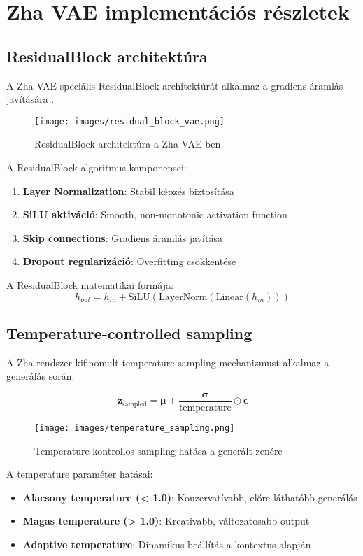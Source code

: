 \section{Zha VAE implementációs részletek}

\subsection{ResidualBlock architektúra}
A Zha VAE speciális ResidualBlock architektúrát alkalmaz a gradiens áramlás javítására \cite{brunner2018midivae}.

\begin{figure}[h]
\centering
\texttt{[image: images/residual\_block\_vae.png]}
\caption{ResidualBlock architektúra a Zha VAE-ben}
\label{fig:residual_block}
\end{figure}

A ResidualBlock algoritmus komponensei:
\begin{enumerate}
\item \textbf{Layer Normalization}: Stabil képzés biztosítása
\item \textbf{SiLU aktiváció}: Smooth, non-monotonic activation function
\item \textbf{Skip connections}: Gradiens áramlás javítása
\item \textbf{Dropout regularizáció}: Overfitting csökkentése
\end{enumerate}

A ResidualBlock matematikai formája:
\[
h_{out} = h_{in} + \text{SiLU}(\text{LayerNorm}(\text{Linear}(h_{in})))
\]

\subsection{Temperature-controlled sampling}
A Zha rendszer kifinomult temperature sampling mechanizmust alkalmaz a generálás során:

\[
\mathbf{z}_{\text{sampled}} = \boldsymbol{\mu} + \frac{\boldsymbol{\sigma}}{\text{temperature}} \odot \boldsymbol{\epsilon}
\]

\begin{figure}[h]
\centering
\texttt{[image: images/temperature\_sampling.png]}
\caption{Temperature kontrollos sampling hatása a generált zenére}
\label{fig:temperature}
\end{figure}

A temperature paraméter hatásai:
\begin{itemize}
\item \textbf{Alacsony temperature (< 1.0)}: Konzervatívabb, előre láthatóbb generálás
\item \textbf{Magas temperature (> 1.0)}: Kreatívabb, változatosabb output
\item \textbf{Adaptive temperature}: Dinamikus beállítás a kontextus alapján
\end{itemize}

